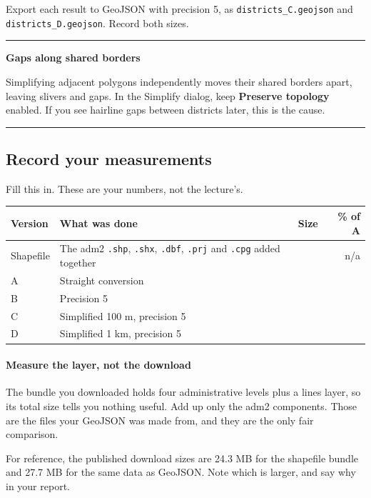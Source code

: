 \documentclass{article}
\newcommand{\cd}[1]{\texttt{#1}}
\newenvironment{keypoint}[1]
  {\par\vspace{.7em}\noindent\rule{\linewidth}{.6pt}\par\vspace{.15em}
   \noindent\textbf{#1}\par\nobreak\vspace{-.3em}}
  {\par\vspace{.15em}\noindent\rule{\linewidth}{.6pt}\par\vspace{.7em}}
\begin{document}
\vspace{.8em}
Export each result to GeoJSON with precision 5, as
\cd{districts\_C.geojson} and \cd{districts\_D.geojson}. Record both
sizes.

\begin{keypoint}{Gaps along shared borders}
Simplifying adjacent polygons independently moves their shared borders
apart, leaving slivers and gaps. In the Simplify dialog, keep
\textbf{Preserve topology} enabled. If you see hairline gaps between
districts later, this is the cause.
\end{keypoint}


\subsection{Record your measurements}

Fill this in. These are your numbers, not the lecture's.

\vspace{.6em}
\begin{tabularx}{\textwidth}{@{}L{2.2cm} X r r@{}}
\toprule
\textbf{Version} & \textbf{What was done} & \textbf{Size} & \textbf{\% of A} \\
\midrule
Shapefile & The adm2 \cd{.shp}, \cd{.shx}, \cd{.dbf}, \cd{.prj} and
            \cd{.cpg} added together & \hspace{2cm} & n/a \\
A         & Straight conversion               & & \\
B         & Precision 5                       & & \\
C         & Simplified 100 m, precision 5     & & \\
D         & Simplified 1 km, precision 5      & & \\
\bottomrule
\end{tabularx}

\paragraph{Measure the layer, not the download}
The bundle you downloaded holds four administrative levels plus a lines
layer, so its total size tells you nothing useful. Add up only the adm2
components. Those are the files your GeoJSON was made from, and they are
the only fair comparison.

For reference, the published download sizes are 24.3 MB for the
shapefile bundle and 27.7 MB for the same data as GeoJSON. Note which
is larger, and say why in your report.
\end{document}
